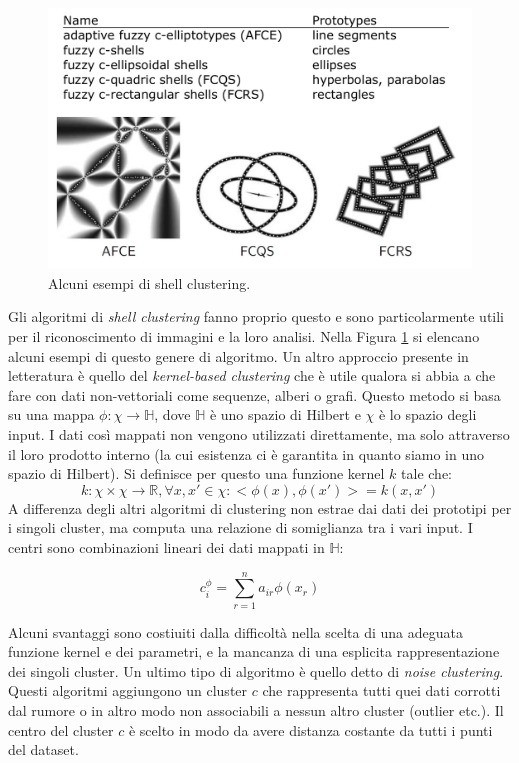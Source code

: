 \documentclass[10pt,a4paper]{article}
\begin{document}
\begin{figure}
\centering
\includegraphics[scale=0.3]{img/shellcluster.png}
\caption{Alcuni esempi di shell clustering.}
\label{fig:34}
\end{figure}

Gli algoritmi di \emph{shell clustering} fanno proprio questo e sono particolarmente utili per il riconoscimento di immagini e la loro analisi. Nella Figura \ref{fig:34} si elencano alcuni esempi di questo genere di algoritmo. Un altro approccio presente in letteratura è quello del \emph{kernel-based clustering} che è utile qualora si abbia a che fare con dati non-vettoriali come sequenze, alberi o grafi. Questo metodo si basa su una mappa $\phi: \chi \to \mathbb{H}$, dove $\mathbb{H}$ è uno spazio di Hilbert e $\chi$ è lo spazio degli input. I dati così mappati non vengono utilizzati direttamente, ma solo attraverso il loro prodotto interno (la cui esistenza ci è garantita in quanto siamo in uno spazio di Hilbert). Si definisce per questo una funzione kernel $k$ tale che:
$$
k: \chi \times \chi \to \mathbb{R}, \forall x,x' \in \chi: <\phi(x),\phi(x')> = k(x,x')
$$
A differenza degli altri algoritmi di clustering non estrae dai dati dei prototipi per i singoli cluster, ma computa una relazione di somiglianza tra i vari input. I centri sono combinazioni lineari dei dati mappati in $\mathbb{H}$:

$$
c_i^{\phi} = \sum_{r=1}^n a_{ir} \phi(x_r)
$$

Alcuni svantaggi sono costiuiti dalla difficoltà nella scelta di una adeguata funzione kernel e dei parametri, e la mancanza di una esplicita rappresentazione dei singoli cluster. Un ultimo tipo di algoritmo è quello detto di \emph{noise clustering}. Questi algoritmi aggiungono un cluster $c$ che rappresenta tutti quei dati corrotti dal rumore o in altro modo non associabili a nessun altro cluster (outlier etc.). Il centro del cluster $c$ è scelto in modo da avere distanza costante da tutti i punti del dataset.
\end{document}
